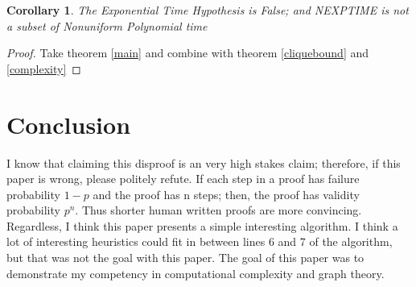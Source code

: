\documentclass[12pt]{article}
\newtheorem{cor}[thm]{Corollary}
\begin{document}
\begin{cor} The Exponential Time Hypothesis is False; and NEXPTIME is not a subset of Nonuniform Polynomial time\end{cor}
\begin{proof} Take theorem \ref{main} and combine with theorem \ref{cliquebound} and \ref{complexity} \end{proof}
\section{Conclusion}
I know that claiming this disproof is an very high stakes claim; therefore, if this paper is wrong, please politely refute. If each step in a proof has failure probability $1-p$ and the proof has n steps; then, the proof has validity probability $p^n$. Thus shorter human written proofs are more convincing. Regardless, I think this paper presents a simple interesting algorithm. I think a lot of interesting heuristics could fit in between lines 6 and 7 of the algorithm, but that was not the goal with this paper. The goal of this paper was to demonstrate my competency in computational complexity and graph theory.


\end{document}
